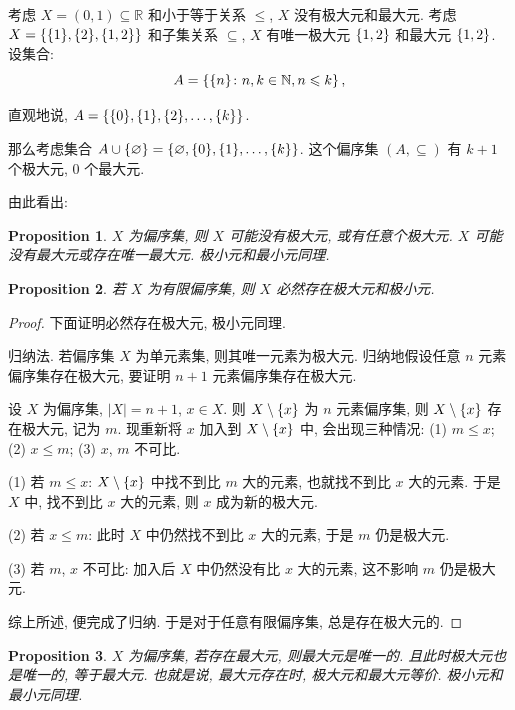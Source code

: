 \documentclass[UTF8]{ctexart}
\theoremstyle{mystyle}
\newtheorem{proposition}{Proposition}[section]
\theoremstyle{myremark}
\theoremstyle{plain}
\newcommand{\R}{\mathbb R}
\newcommand{\N}{\mathbb N}
\DeclarePairedDelimiter\set{\{}{\}}
\begin{document}
考虑 $ X = (0, 1) \subseteq \R $ 和小于等于关系 $ \leqslant $, $ X $ 没有极大元和最大元. 考虑 $ X = \set{\set{1}, \set{2}, \set{1, 2}} $ 和子集关系 $ \subseteq $, $ X $ 有唯一极大元 $ \set{1, 2} $ 和最大元 $ \set{1, 2} $. 设集合:
\[ A = \set{\set{n} \colon n, k \in \N, n \leqslant k} \,,\]

直观地说, $ A = \set{\set{0}, \set{1}, \set{2}, \dots, \set{k}} $.

那么考虑集合 $ A \cup \set{\varnothing} = \set{\varnothing, \set{0}, \set{1}, \dots, \set{k}} $. 这个偏序集 $ (A, \subseteq) $ 有 $ k + 1 $ 个极大元, $ 0 $ 个最大元.

由此看出:

\begin{proposition}
    $ X $ 为偏序集, 则 $ X $ 可能没有极大元, 或有任意个极大元. $ X $ 可能没有最大元或存在唯一最大元. 极小元和最小元同理.
\end{proposition}

\begin{proposition}
    若 $ X $ 为有限偏序集, 则 $ X $ 必然存在极大元和极小元.
\end{proposition}

\begin{proof}
    下面证明必然存在极大元, 极小元同理.

    归纳法. 若偏序集 $ X $ 为单元素集, 则其唯一元素为极大元. 归纳地假设任意 $ n $ 元素偏序集存在极大元, 要证明 $ n + 1 $ 元素偏序集存在极大元.

    设 $ X $ 为偏序集, $ |X| = n + 1 $, $ x \in X $. 则 $ X \setminus \set{x} $ 为 $ n $ 元素偏序集, 则 $ X \setminus \set{x} $ 存在极大元, 记为 $ m $. 现重新将 $ x $ 加入到 $ X \setminus \set{x} $ 中, 会出现三种情况: (1) $ m \le x $; (2) $ x \le m $; (3) $ x $, $ m $ 不可比.

    (1) 若 $ m \le x $: $ X \setminus \set{x} $ 中找不到比 $ m $ 大的元素, 也就找不到比 $ x $ 大的元素. 于是 $ X $ 中, 找不到比 $ x $ 大的元素, 则 $ x $ 成为新的极大元.

    (2) 若 $ x \le m $: 此时 $ X $ 中仍然找不到比 $ x $ 大的元素, 于是 $ m $ 仍是极大元.

    (3) 若 $ m $, $ x $ 不可比: 加入后 $ X $ 中仍然没有比 $ x $ 大的元素, 这不影响 $ m $ 仍是极大元.

    综上所述, 便完成了归纳. 于是对于任意有限偏序集, 总是存在极大元的.
\end{proof}

\begin{proposition}
    $ X $ 为偏序集, 若存在最大元, 则最大元是唯一的. 且此时极大元也是唯一的, 等于最大元. 也就是说, 最大元存在时, 极大元和最大元等价. 极小元和最小元同理.
\end{proposition}
\end{document}

